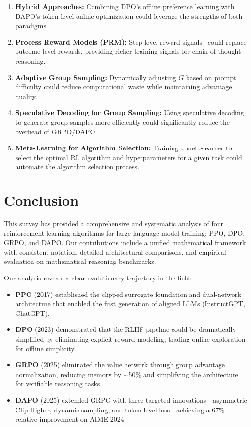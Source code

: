 \begin{enumerate}[leftmargin=*, itemsep=2pt]
\item \textbf{Hybrid Approaches:} Combining DPO's offline preference learning with DAPO's token-level online optimization could leverage the strengths of both paradigms.
\item \textbf{Process Reward Models (PRM):} Step-level reward signals~\cite{lightman2024verify, uesato2022solving, wang2024mathshepherd} could replace outcome-level rewards, providing richer training signals for chain-of-thought reasoning.
\item \textbf{Adaptive Group Sampling:} Dynamically adjusting $G$ based on prompt difficulty could reduce computational waste while maintaining advantage quality.
\item \textbf{Speculative Decoding for Group Sampling:} Using speculative decoding to generate group samples more efficiently could significantly reduce the overhead of GRPO/DAPO.
\item \textbf{Meta-Learning for Algorithm Selection:} Training a meta-learner to select the optimal RL algorithm and hyperparameters for a given task could automate the algorithm selection process.
\end{enumerate}

\section{Conclusion}
\label{sec:conclusion}

This survey has provided a comprehensive and systematic analysis of four reinforcement learning algorithms for large language model training: PPO, DPO, GRPO, and DAPO. Our contributions include a unified mathematical framework with consistent notation, detailed architectural comparisons, and empirical evaluation on mathematical reasoning benchmarks.

Our analysis reveals a clear evolutionary trajectory in the field:
\begin{itemize}[leftmargin=*, itemsep=1pt]
\item \textbf{PPO} (2017) established the clipped surrogate foundation and dual-network architecture that enabled the first generation of aligned LLMs (InstructGPT, ChatGPT).
\item \textbf{DPO} (2023) demonstrated that the RLHF pipeline could be dramatically simplified by eliminating explicit reward modeling, trading online exploration for offline simplicity.
\item \textbf{GRPO} (2025) eliminated the value network through group advantage normalization, reducing memory by $\sim$50\% and simplifying the architecture for verifiable reasoning tasks.
\item \textbf{DAPO} (2025) extended GRPO with three targeted innovations---asymmetric Clip-Higher, dynamic sampling, and token-level loss---achieving a 67\% relative improvement on AIME 2024.
\end{itemize}

